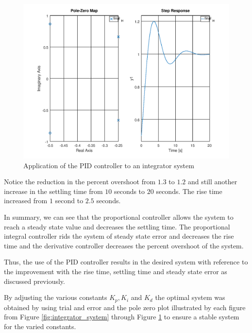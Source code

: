 \documentclass[a4paper, 12pt]{article}
\begin{document}
\begin{figure}[H]
	\centering
	\includegraphics[width=\textwidth]{integrator_system_proportional_integral_derivative_controller.png}
	\caption{Application of the PID controller to an integrator system}
	\label{fig:integrator_system_proportional_integral_derivative_controller}
\end{figure}

Notice the reduction in the percent overshoot from $1.3$ to $1.2$ and still
another increase in the settling time from $10$ seconds to $20$ seconds. The
rise time increased from $1$ second to $2.5$ seconds.

\par

In summary, we can see that the proportional controller allows the system to
reach a steady state value and decreases the settling time. The proportional
integral controller rids the system of steady state error and decreases the
rise time and the derivative controller decreases the percent overshoot of the
system.

Thus, the use of the PID controller results in the desired system with reference
to the improvement with the rise time, settling time and steady state error as
discussed previously.

By adjusting the various constants $K_p, K_i$ and $K_d$ the optimal system was
obtained by using trial and error and the pole zero plot illustrated by each
figure from Figure \ref{fig:integrator_system} through Figure
\ref{fig:integrator_system_proportional_integral_derivative_controller} to
ensure a stable system for the varied constants.

\end{document}
